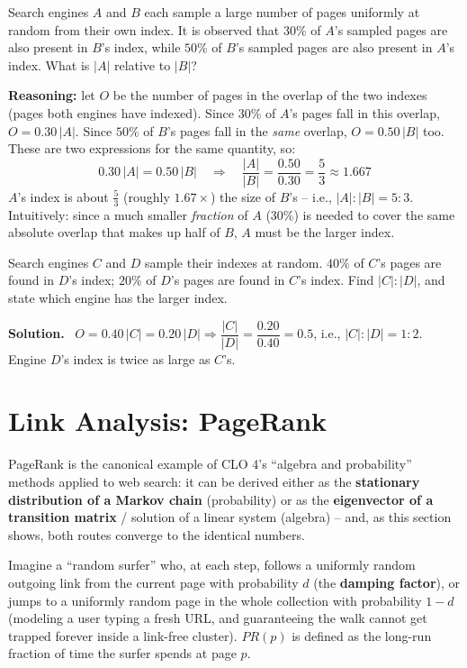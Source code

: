 \documentclass[11pt, a4paper]{article}
\newcommand{\Solution}{\medskip\noindent\textbf{\color{exgreen}Solution.}\ }
\begin{document}
\begin{examplebox}
Search engines $A$ and $B$ each sample a large number of pages uniformly at random from their own index. It is observed that $30\%$ of $A$'s sampled pages are also present in $B$'s index, while $50\%$ of $B$'s sampled pages are also present in $A$'s index. What is $|A|$ relative to $|B|$?

\textbf{Reasoning:} let $O$ be the number of pages in the overlap of the two indexes (pages both engines have indexed). Since $30\%$ of $A$'s pages fall in this overlap, $O = 0.30\,|A|$. Since $50\%$ of $B$'s pages fall in the \emph{same} overlap, $O = 0.50\,|B|$ too. These are two expressions for the same quantity, so:
\[
0.30\,|A| = 0.50\,|B| \quad\Longrightarrow\quad \frac{|A|}{|B|} = \frac{0.50}{0.30} = \frac{5}{3} \approx 1.667
\]
$A$'s index is about $\frac53$ (roughly $1.67\times$) the size of $B$'s -- i.e., $|A|:|B| = 5:3$. Intuitively: since a much smaller \emph{fraction} of $A$ ($30\%$) is needed to cover the same absolute overlap that makes up half of $B$, $A$ must be the larger index.
\end{examplebox}

\begin{exercisebox}
Search engines $C$ and $D$ sample their indexes at random. $40\%$ of $C$'s pages are found in $D$'s index; $20\%$ of $D$'s pages are found in $C$'s index. Find $|C|:|D|$, and state which engine has the larger index.
\end{exercisebox}

\Solution
$O = 0.40\,|C| = 0.20\,|D| \Rightarrow \dfrac{|C|}{|D|} = \dfrac{0.20}{0.40} = 0.5$, i.e., $|C|:|D| = 1:2$. Engine $D$'s index is twice as large as $C$'s.

\section{Link Analysis: PageRank}
\label{sec:pagerank}

PageRank is the canonical example of CLO 4's ``algebra and probability'' methods applied to web search: it can be derived either as the \textbf{stationary distribution of a Markov chain} (probability) or as the \textbf{eigenvector of a transition matrix} / solution of a linear system (algebra) -- and, as this section shows, both routes converge to the identical numbers.

\begin{defbox}
Imagine a ``random surfer'' who, at each step, follows a uniformly random outgoing link from the current page with probability $d$ (the \textbf{damping factor}), or jumps to a uniformly random page in the whole collection with probability $1-d$ (modeling a user typing a fresh URL, and guaranteeing the walk cannot get trapped forever inside a link-free cluster). $PR(p)$ is defined as the long-run fraction of time the surfer spends at page $p$.
\end{defbox}
\end{document}
